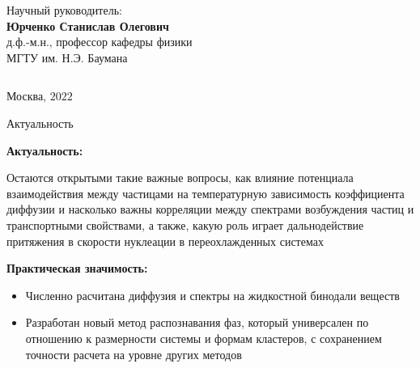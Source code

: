 \documentclass{beamer}
\begin{document}
\begin{frame}
\begin{columns}
\begin{column}{0.50\textwidth}
\begin{center}
\tiny Научный руководитель:\\
\vspace{0.1cm}
\tiny \textbf{Юрченко Станислав Олегович} \\
\tiny д.ф.-м.н., профессор кафедры физики\\
\tiny МГТУ им. Н.Э. Баумана \\
\end{center}


\end{column}
\end{columns}


\vspace{0.5cm}
\begin{center}
\tiny Москва, $2022$
\end{center}
\end{frame}










\begin{frame}{Актуальность}
\footnotesize{

\textbf{Актуальность:}

Остаются открытыми такие важные вопросы, как влияние потенциала взаимодействия между частицами на температурную зависимость коэффициента диффузии и насколько важны корреляции между спектрами возбуждения частиц и транспортными свойствами, а также, какую роль играет дальнодействие притяжения в скорости нуклеации в переохлажденных системах

\vspace{1cm}

\textbf{Практическая значимость:}

\begin{itemize}
 \item Численно расчитана диффузия и спектры на жидкостной бинодали веществ
 \item Разработан новый метод распознавания фаз, который универсален по отношению к размерности системы и формам кластеров, с сохранением точности расчета на уровне других методов
\end{itemize}


}
\end{frame}
\end{document}
